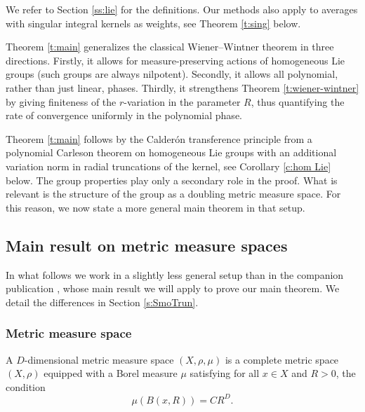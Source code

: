 \documentclass[12pt,reqno,a4paper,dvipsnames]{amsart}
\theoremstyle{plain}
\theoremstyle{definition}
\numberwithin{theorem}{section}
\numberwithin{equation}{section}
\newcommand{\AD}{D}
\begin{document}
We refer to Section \ref{ss:lie} for the definitions. Our methods also apply to averages with singular integral kernels as weights, see Theorem \ref{t:sing} below. 

Theorem \ref{t:main} generalizes the classical Wiener--Wintner theorem in three directions. Firstly, it allows for measure-preserving actions of homogeneous Lie groups (such groups are always nilpotent). Secondly, it allows all polynomial, rather than just linear, phases. Thirdly, it strengthens Theorem \ref{t:wiener-wintner} by giving finiteness of the $r$-variation in the parameter $R$, thus quantifying the rate of convergence uniformly in the polynomial phase. 

Theorem \ref{t:main} follows by the Calderón transference principle from a polynomial Carleson theorem on homogeneous Lie groups with an additional variation norm in radial truncations of the kernel, see Corollary \ref{c:hom Lie} below. The group properties play only a secondary role in the proof.  What is relevant is the structure of the group as a doubling metric measure space. For this reason, we now state a more general main theorem in that setup.

\subsection{Main result on metric measure spaces}\label{ss:setup results} 

In what follows we work in a slightly less general setup than in the companion publication \cite{beckeretal}, whose main result we will apply to prove our main theorem. We detail the differences in Section \ref{s:SmoTrun}.

\subsubsection{Metric measure space}
A $\AD$-dimensional metric measure space $(X,\rho,\mu)$ is a complete metric space $(X,\rho)$ equipped with a Borel measure $\mu$ satisfying for all  $x \in X$ and $R > 0$, the condition
\begin{equation}\label{e:ADregular}
    \mu(B(x,R)) = C R^{\AD}.
\end{equation}
\end{document}
